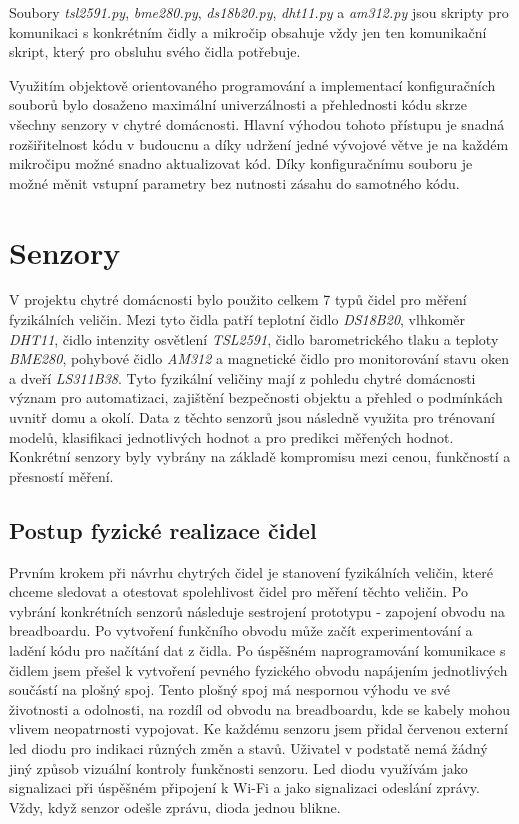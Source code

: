Soubory \textit{tsl2591.py}, \textit{bme280.py}, \textit{ds18b20.py}, \textit{dht11.py} a \textit{am312.py} jsou skripty pro komunikaci s konkrétním čidly a mikročip obsahuje vždy jen ten komunikační skript, který pro obsluhu svého čidla potřebuje. \par
Využitím objektově orientovaného programování a implementací konfiguračních souborů bylo dosaženo maximální univerzálnosti a přehlednosti kódu skrze všechny senzory v chytré domácnosti. Hlavní výhodou tohoto přístupu je snadná rozšiřitelnost kódu v budoucnu a díky udržení jedné vývojové větve je na každém mikročipu možné snadno aktualizovat kód. Díky konfiguračnímu souboru je možné měnit vstupní parametry bez nutnosti zásahu do samotného kódu. 

\section{Senzory} \label{sec:sensors}
V projektu chytré domácnosti bylo použito celkem 7 typů čidel pro měření fyzikálních veličin. Mezi tyto čidla patří teplotní čidlo \textit{DS18B20}, vlhkoměr \textit{DHT11}, čidlo intenzity osvětlení \textit{TSL2591}, čidlo barometrického tlaku a teploty \textit{BME280}, pohybové čidlo \textit{AM312} a magnetické čidlo pro monitorování stavu oken a dveří \textit{LS311B38}. Tyto fyzikální veličiny mají z pohledu chytré domácnosti význam pro automatizaci, zajištění bezpečnosti objektu a přehled o podmínkách uvnitř domu a okolí. Data z těchto senzorů jsou následně využita pro trénovaní modelů, klasifikaci jednotlivých hodnot a pro predikci měřených hodnot. Konkrétní senzory byly vybrány na základě kompromisu mezi cenou, funkčností a přesností měření. 

\subsection*{Postup fyzické realizace čidel}
Prvním krokem při návrhu chytrých čidel je stanovení fyzikálních veličin, které chceme sledovat a otestovat spolehlivost čidel pro měření těchto veličin. Po vybrání konkrétních senzorů následuje sestrojení prototypu - zapojení obvodu na breadboardu. Po vytvoření funkčního obvodu může začít experimentování a ladění kódu pro načítání dat z čidla. Po úspěšném naprogramování komunikace s čidlem jsem přešel k vytvoření pevného fyzického obvodu napájením jednotlivých součástí na plošný spoj. Tento plošný spoj má nespornou výhodu ve své životnosti a odolnosti, na rozdíl od obvodu na breadboardu, kde se kabely mohou vlivem neopatrnosti vypojovat. Ke každému senzoru jsem přidal červenou externí led diodu pro indikaci různých změn a stavů. Uživatel v podstatě nemá žádný jiný způsob vizuální kontroly funkčnosti senzoru. Led diodu využívám jako signalizaci při úspěšném připojení k Wi-Fi a jako signalizaci odeslání zprávy. Vždy, když senzor odešle zprávu, dioda jednou blikne.


